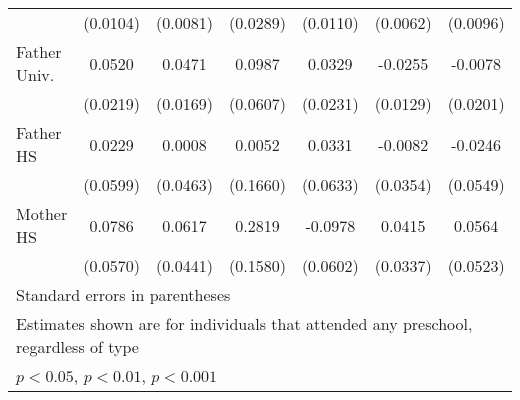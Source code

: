 \begin{table}[htbp]
\begin{tabular}{l*{6}{c}}
            &    (0.0104)         &    (0.0081)         &    (0.0289)         &    (0.0110)         &    (0.0062)         &    (0.0096)         \\
\addlinespace
Father Univ.&      0.0520\sym{*}  &      0.0471\sym{**} &      0.0987         &      0.0329         &     -0.0255\sym{*}  &     -0.0078         \\
            &    (0.0219)         &    (0.0169)         &    (0.0607)         &    (0.0231)         &    (0.0129)         &    (0.0201)         \\
\addlinespace
Father HS   &      0.0229         &      0.0008         &      0.0052         &      0.0331         &     -0.0082         &     -0.0246         \\
            &    (0.0599)         &    (0.0463)         &    (0.1660)         &    (0.0633)         &    (0.0354)         &    (0.0549)         \\
\addlinespace
Mother HS   &      0.0786         &      0.0617         &      0.2819         &     -0.0978         &      0.0415         &      0.0564         \\
            &    (0.0570)         &    (0.0441)         &    (0.1580)         &    (0.0602)         &    (0.0337)         &    (0.0523)         \\
\bottomrule
\multicolumn{7}{l}{\footnotesize Standard errors in parentheses}\\
\multicolumn{7}{l}{\footnotesize Estimates shown are for individuals that attended any preschool, regardless of type}\\
\multicolumn{7}{l}{\footnotesize \sym{*} \(p<0.05\), \sym{**} \(p<0.01\), \sym{***} \(p<0.001\)}\\
\end{tabular}
\end{table}
